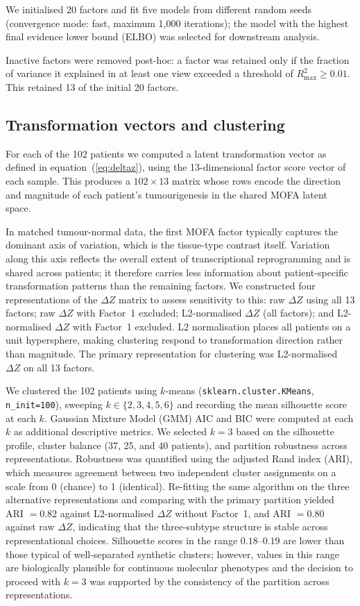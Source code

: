 We initialised 20 factors and fit five models from different random seeds
(convergence mode: fast, maximum 1,000 iterations); the model with the highest
final evidence lower bound (ELBO) was selected for downstream analysis.

Inactive factors were removed post-hoc: a factor was retained only if the fraction of
variance it explained in at least one view exceeded a threshold of $R^2_{\max} \geq 0.01$.
This retained 13 of the initial 20 factors.

\subsection{Transformation vectors and clustering}

For each of the 102 patients we computed a latent transformation vector as defined
in equation~(\ref{eq:deltaz}), using the 13-dimensional factor score vector of each sample.
This produces a $102 \times 13$ matrix whose rows encode the direction and magnitude
of each patient's tumourigenesis in the shared MOFA latent space.

In matched tumour-normal data, the first MOFA factor typically captures the dominant
axis of variation, which is the tissue-type contrast itself.
Variation along this axis reflects the overall extent of transcriptional reprogramming
and is shared across patients; it therefore carries less information about
patient-specific transformation patterns than the remaining factors.
We constructed four representations of the $\Delta Z$ matrix to assess sensitivity
to this: raw $\Delta Z$ using all 13 factors; raw $\Delta Z$ with Factor~1 excluded;
L2-normalised $\Delta Z$ (all factors); and L2-normalised $\Delta Z$ with Factor~1
excluded.
L2 normalisation places all patients on a unit hypersphere, making clustering
respond to transformation direction rather than magnitude.
The primary representation for clustering was L2-normalised $\Delta Z$ on all 13 factors.

We clustered the 102 patients using $k$-means (\texttt{sklearn.cluster.KMeans},
\texttt{n\_init=100}), sweeping $k \in \{2, 3, 4, 5, 6\}$ and recording the mean
silhouette score at each $k$.
Gaussian Mixture Model (GMM) AIC and BIC were computed at each $k$ as additional
descriptive metrics.
We selected $k = 3$ based on the silhouette profile, cluster balance (37, 25, and
40 patients), and partition robustness across representations.
Robustness was quantified using the adjusted Rand index (ARI), which measures
agreement between two independent cluster assignments on a scale from 0 (chance)
to 1 (identical).
Re-fitting the same algorithm on the three alternative representations and comparing
with the primary partition yielded ARI $= 0.82$ against L2-normalised $\Delta Z$
without Factor~1, and ARI $= 0.80$ against raw $\Delta Z$, indicating that the
three-subtype structure is stable across representational choices.
Silhouette scores in the range $0.18$--$0.19$ are lower than those typical of
well-separated synthetic clusters; however, values in this range are biologically
plausible for continuous molecular phenotypes and the decision to proceed with
$k = 3$ was supported by the consistency of the partition across representations.

